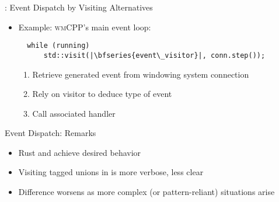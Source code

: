 \begin{frame}[fragile]{\underline{\cpp}: Event Dispatch by Visiting Alternatives \hfill {\footnotesize \currentname}}


    \begin{itemize}

        \item Example: \textsc{wmCPP}'s main event loop:\\
\begin{verbatim}
  while (running)
      std::visit(|\bfseries{event\_visitor}|, conn.step());
\end{verbatim}

    \vspace*{5pt}\begin{enumerate}

        \item Retrieve generated event from windowing system connection

        \item Rely on visitor to deduce type of event

        \item Call associated handler

    \end{enumerate}

    \end{itemize}

    \vfill

\end{frame}

\begin{frame}[fragile]{Event Dispatch: Remarks \hfill {\footnotesize \currentname}}

    \begin{itemize}

        \item Rust and \cpp achieve desired behavior

        \item Visiting tagged unions in \cpp is more verbose, less clear

        \item Difference worsens as more complex (or pattern-reliant) situations arise

    \end{itemize}

    \vfill

\end{frame}
